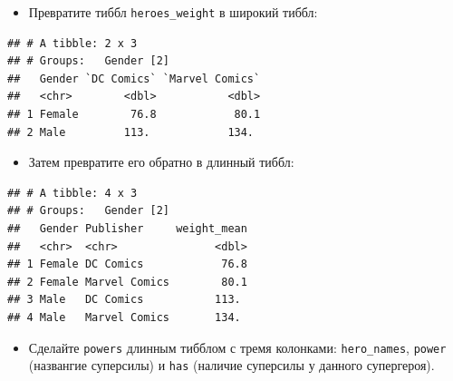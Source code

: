 \documentclass[]{book}
\newenvironment{Shaded}{\begin{snugshade}}{\end{snugshade}}
\newcommand{\KeywordTok}[1]{\textcolor[rgb]{0.13,0.29,0.53}{\textbf{#1}}}
\newcommand{\DataTypeTok}[1]{\textcolor[rgb]{0.13,0.29,0.53}{#1}}
\newcommand{\StringTok}[1]{\textcolor[rgb]{0.31,0.60,0.02}{#1}}
\newcommand{\OperatorTok}[1]{\textcolor[rgb]{0.81,0.36,0.00}{\textbf{#1}}}
\newcommand{\NormalTok}[1]{#1}
\providecommand{\tightlist}{%
  \setlength{\itemsep}{0pt}\setlength{\parskip}{0pt}}
\begin{document}
\begin{itemize}
\tightlist
\item
  Превратите тиббл \texttt{heroes\_weight} в широкий тиббл:
\end{itemize}

\begin{Shaded}
\end{Shaded}

\begin{verbatim}
## # A tibble: 2 x 3
## # Groups:   Gender [2]
##   Gender `DC Comics` `Marvel Comics`
##   <chr>        <dbl>           <dbl>
## 1 Female        76.8            80.1
## 2 Male         113.            134.
\end{verbatim}

\begin{itemize}
\tightlist
\item
  Затем превратите его обратно в длинный тиббл:
\end{itemize}

\begin{Shaded}
\end{Shaded}

\begin{verbatim}
## # A tibble: 4 x 3
## # Groups:   Gender [2]
##   Gender Publisher     weight_mean
##   <chr>  <chr>               <dbl>
## 1 Female DC Comics            76.8
## 2 Female Marvel Comics        80.1
## 3 Male   DC Comics           113. 
## 4 Male   Marvel Comics       134.
\end{verbatim}

\begin{itemize}
\tightlist
\item
  Сделайте \texttt{powers} длинным тибблом с тремя колонками:
  \texttt{hero\_names}, \texttt{power} (названгие суперсилы) и
  \texttt{has} (наличие суперсилы у данного супергероя).
\end{itemize}
\end{document}
